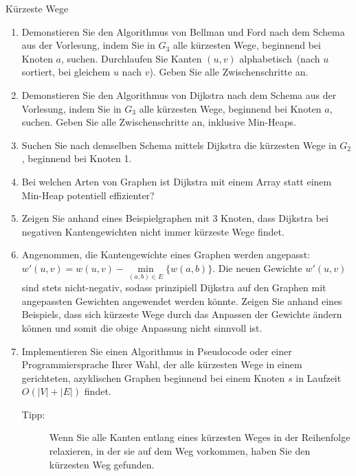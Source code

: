\documentclass[11pt,a4paper]{article}
\begin{document}
\begin{aufgabe}{3}{Kürzeste Wege}
\begin{figure}[h!]
    \end{figure}
    \FloatBarrier
    \begin{enumerate}[label=\alph*)]
        \item Demonstieren Sie den Algorithmus von Bellman und Ford nach dem Schema aus der Vorlesung, indem Sie in $G_3$ alle kürzesten Wege, beginnend bei Knoten $a$, suchen.
        Durchlaufen Sie Kanten $(u, v)$ alphabetisch~(nach $u$ sortiert, bei gleichem $u$ nach $v$).
        Geben Sie alle Zwischenschritte an.
        \item Demonstieren Sie den Algorithmus von Dijkstra nach dem Schema aus der Vorlesung, indem Sie in $G_3$ alle kürzesten Wege, beginnend bei Knoten $a$, suchen.
        Geben Sie alle Zwischenschritte an, inklusive Min-Heaps.
        \item Suchen Sie nach demselben Schema mittels Dijkstra die kürzesten Wege in $G_2$, beginnend bei Knoten 1.
        \item Bei welchen Arten von Graphen ist Dijkstra mit einem Array statt einem Min-Heap potentiell effizienter?
        \item Zeigen Sie anhand eines Beispielgraphen mit 3 Knoten, dass Dijkstra bei negativen Kantengewichten nicht immer kürzeste Wege findet.
        \item Angenommen, die Kantengewichte eines Graphen werden angepasst: $w'(u, v) = w(u, v) - \min\limits_{(a, b) \in E} \{w(a, b) \}$.
        Die neuen Gewichte $w'(u, v)$ sind stets nicht-negativ, sodass prinzipiell Dijkstra auf den Graphen mit angepassten Gewichten angewendet werden könnte.
        Zeigen Sie anhand eines Beispiels, dass sich kürzeste Wege durch das Anpassen der Gewichte ändern können und somit die obige Anpassung nicht sinnvoll ist.
        \item\label{shortest_paths_dag} Implementieren Sie einen Algorithmus in Pseudocode oder einer Programmiersprache Ihrer Wahl, der alle kürzesten Wege in einem gerichteten, azyklischen Graphen beginnend bei einem Knoten $s$ in Laufzeit $O(|V| + |E|)$ findet.
        \begin{description}
            \item[Tipp:] Wenn Sie alle Kanten entlang eines kürzesten Weges in der Reihenfolge relaxieren, in der sie auf dem Weg vorkommen, haben Sie den kürzesten Weg gefunden.
        \end{description}
    \end{enumerate}
\end{aufgabe}
\end{document}
